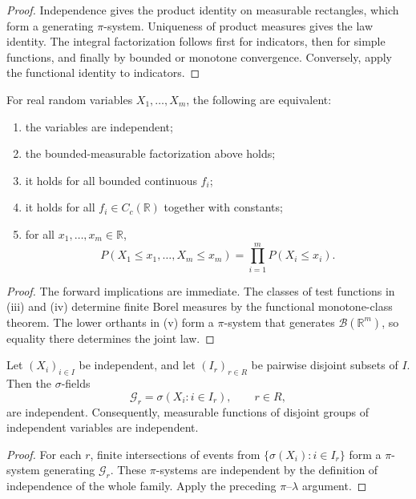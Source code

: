 \begin{proof}
Independence gives the product identity on measurable rectangles, which form
a generating $\pi$-system. Uniqueness of product measures gives the law
identity. The integral factorization follows first for indicators, then for
simple functions, and finally by bounded or monotone convergence. Conversely,
apply the functional identity to indicators.
\end{proof}

\begin{prop}
For real random variables $X_1,\ldots,X_m$, the following are equivalent:
\begin{enumerate}[label=(\roman*)]
  \item the variables are independent;
  \item the bounded-measurable factorization above holds;
  \item it holds for all bounded continuous $f_i$;
  \item it holds for all $f_i\in C_c(\mathbb R)$ together with constants;
  \item for all $x_1,\ldots,x_m\in\mathbb R$,
  \[
  P(X_1\leq x_1,\ldots,X_m\leq x_m)
   =\prod_{i=1}^{m}P(X_i\leq x_i).
  \]
\end{enumerate}
\end{prop}

\begin{proof}
The forward implications are immediate. The classes of test functions in
(iii) and (iv) determine finite Borel measures by the functional
monotone-class theorem. The lower orthants in (v) form a $\pi$-system that
generates $\mathcal B(\mathbb R^m)$, so equality there determines the joint
law.
\end{proof}

\begin{lem}
Let $(X_i)_{i\in I}$ be independent, and let $(I_r)_{r\in R}$ be pairwise
disjoint subsets of $I$. Then the $\sigma$-fields
\[
\mathcal G_r=\sigma(X_i:i\in I_r),\qquad r\in R,
\]
are independent. Consequently, measurable functions of disjoint groups of
independent variables are independent.
\end{lem}

\begin{proof}
For each $r$, finite intersections of events from
$\{\sigma(X_i):i\in I_r\}$ form a $\pi$-system generating $\mathcal G_r$.
These $\pi$-systems are independent by the definition of independence of the
whole family. Apply the preceding $\pi$--$\lambda$ argument.
\end{proof}

